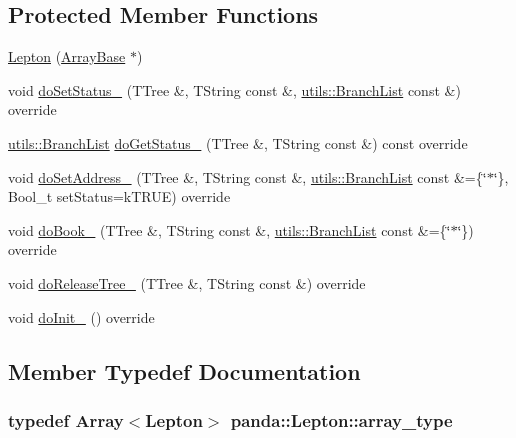 \subsection*{Protected Member Functions}
\begin{DoxyCompactItemize}
\item 
\hyperlink{classpanda_1_1Lepton_af2215481b06eaaaad51a16fb19b6c53b}{Lepton} (\hyperlink{classpanda_1_1ArrayBase}{ArrayBase} $\ast$)
\item 
void \hyperlink{classpanda_1_1Lepton_a2d3b49322244947c933645bbdb44bf88}{doSetStatus\_\-} (TTree \&, TString const \&, \hyperlink{classpanda_1_1utils_1_1BranchList}{utils::BranchList} const \&) override
\item 
\hyperlink{classpanda_1_1utils_1_1BranchList}{utils::BranchList} \hyperlink{classpanda_1_1Lepton_a90a170df4cd09d324964da724bcc5428}{doGetStatus\_\-} (TTree \&, TString const \&) const override
\item 
void \hyperlink{classpanda_1_1Lepton_a2d46b07ce93bec008954f222c6860ff9}{doSetAddress\_\-} (TTree \&, TString const \&, \hyperlink{classpanda_1_1utils_1_1BranchList}{utils::BranchList} const \&=\{\char`\"{}$\ast$\char`\"{}\}, Bool\_\-t setStatus=kTRUE) override
\item 
void \hyperlink{classpanda_1_1Lepton_af9d74c974117a26f53e60da918cb84ba}{doBook\_\-} (TTree \&, TString const \&, \hyperlink{classpanda_1_1utils_1_1BranchList}{utils::BranchList} const \&=\{\char`\"{}$\ast$\char`\"{}\}) override
\item 
void \hyperlink{classpanda_1_1Lepton_ae0f913947dcc9e3827de846e7b885280}{doReleaseTree\_\-} (TTree \&, TString const \&) override
\item 
void \hyperlink{classpanda_1_1Lepton_af764ff1ea6dfb16072d6c9de3b935129}{doInit\_\-} () override
\end{DoxyCompactItemize}


\subsection{Member Typedef Documentation}
\hypertarget{classpanda_1_1Lepton_ad9bce760734162cd7166b034515fe1fe}{
\subsubsection[{array\_\-type}]{\setlength{\rightskip}{0pt plus 5cm}typedef {\bf Array}$<${\bf Lepton}$>$ {\bf panda::Lepton::array\_\-type}}}
\label{classpanda_1_1Lepton_ad9bce760734162cd7166b034515fe1fe}


